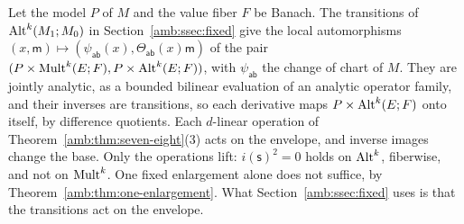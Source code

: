 \begin{remark}\label{amb:rem:action}
Let the model $P$ of $M$ and the value fiber $F$ be Banach. The transitions of $\operatorname{Alt}^k(M_1;M_0)$ in Section~\ref{amb:ssec:fixed} give the local automorphisms $(x,\mathsf m)\mapsto(\psi_{\mathsf{ab}}(x),\Theta_{\mathsf{ab}}(x)\mathsf m)$ of the pair $(P\times\operatorname{Mult}^k(E;F),P\times\operatorname{Alt}^k(E;F))$, with $\psi_{\mathsf{ab}}$ the change of chart of $M$. They are jointly analytic, as a bounded bilinear evaluation of an analytic operator family, and their inverses are transitions, so each derivative maps $P\times\operatorname{Alt}^k(E;F)$ onto itself, by difference quotients. Each $d$-linear operation of Theorem~\ref{amb:thm:seven-eight}(3) acts on the envelope, and inverse images change the base. Only the operations lift: $i(\mathsf s)^2=0$ holds on $\operatorname{Alt}^k$, fiberwise, and not on $\operatorname{Mult}^k$. One fixed enlargement alone does not suffice, by Theorem~\ref{amb:thm:one-enlargement}. What Section~\ref{amb:ssec:fixed} uses is that the transitions act on the envelope.
\end{remark}
